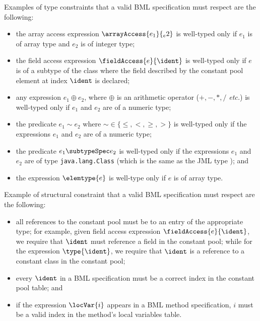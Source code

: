Examples of type constraints that a valid BML specification must
respect are the following:
\begin{itemize}
\item the array access expression
$\arrayAccess{e_1}{_e2}$ is well-typed only if $e_1$ is of array
type and $e_2$ is of integer type;

\item the field access expression
    $\fieldAccess{e}{\ident}$ is well-typed only if $e$ is
    of a subtype of the class where the field described by the constant
    pool element at index $\ident$ is declared;

\item any  expression $ e_1 \oplus e_2$, where \(\oplus\) is an arithmetic 
operator (\(+,-,*,/\) \emph{etc.}) is well-typed only if $e_1$ and $
e_2$ are of a numeric type;
    
\item the predicate $e_1 \sim e_2$ where $\sim \in \{\leq,<,\geq,
>\}$ is well-typed only if the expressions $e_1$ and $e_2$ are of a 
numeric type;

\item the predicate $e_1 \subtypeSpec e_2$ is well-typed only if the 
expressions $e_1$ and $e_ 2$ are of type \texttt{java.lang.Class}
(which is the same as the JML type \TYPE); and

\item the expression $\elemtype{e}$ is well-type only if $e$ is of array type.

	  
\end{itemize}

Example of structural constraint that a valid BML specification must
respect are the following: 
\begin{itemize}
\item all references to the constant pool must be to an entry of the
appropriate type; for example, given field access expression
$\fieldAccess{e}{\ident}$, we require that $\ident$ must reference a
field in the constant pool; while for the expression $\type{\ident}$,
we require that \(\ident\) is a reference to a constant class in the
constant pool;
    
\item every $\ident$ in a BML specification must be a correct
index in the constant pool table; and
    
\item if the expression $\locVar{i}$ appears in a BML method 
specification, $i$ must be a valid index in the method's local
variables table.
\end{itemize}

